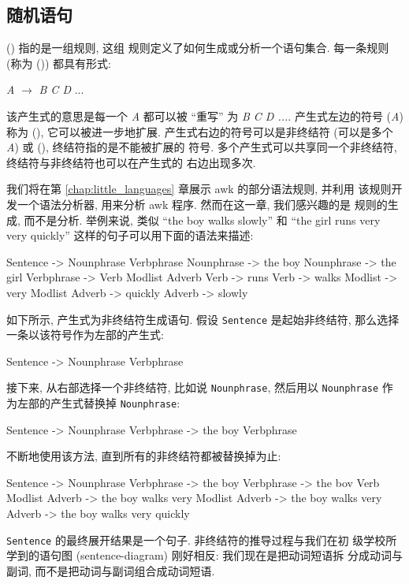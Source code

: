 \subsection{随机语句}
\label{subsec:random_sentences}

 () 指的是一组规则, 这组
规则定义了如何生成或分析一个语句集合. 每一条规则 (称为 
()) 都具有形式:
\begin{pattern}
    \indent\indent\textit{A} $\longrightarrow$ \textit{B C D} ...
\end{pattern}
该产生式的意思是每一个 \textit{A} 都可以被 ``重写'' 为 \textit{B C D ...}.
产生式左边的符号 (\textit{A}) 称为  (),
它可以被进一步地扩展. 产生式右边的符号可以是非终结符 (可以是多个
\textit{A}) 或  (), 终结符指的是不能被扩展的
符号. 多个产生式可以共享同一个非终结符, 终结符与非终结符也可以在产生式的
右边出现多次.

我们将在第 \ref{chap:little_languages} 章展示 awk 的部分语法规则, 并利用
该规则开发一个语法分析器, 用来分析 awk 程序. 然而在这一章, 我们感兴趣的是
规则的生成, 而不是分析. 举例来说, 类似 ``the boy walks slowly'' 和 ``the
girl runs very very quickly'' 这样的句子可以用下面的语法来描述:
\begin{file}
    Sentence -> Nounphrase Verbphrase
    Nounphrase -> the boy
    Nounphrase -> the girl
    Verbphrase -> Verb Modlist Adverb
    Verb -> runs
    Verb -> walks
    Modlist -> very Modlist
    Adverb -> quickly
    Adverb -> slowly
\end{file}

如下所示, 产生式为非终结符生成语句. 假设 \texttt{Sentence} 是起始非终结符,
那么选择一条以该符号作为左部的产生式:
\begin{file}
    Sentence -> Nounphrase Verbphrase
\end{file}
接下来, 从右部选择一个非终结符, 比如说 \texttt{Nounphrase}, 然后用以
\texttt{Nounphrase} 作为左部的产生式替换掉 \texttt{Nounphrase}:
\begin{file}
    Sentence -> Nounphrase Verbphrase
             -> the boy Verbphrase
\end{file}
不断地使用该方法, 直到所有的非终结符都被替换掉为止:
\begin{file}
    Sentence -> Nounphrase Verbphrase
             -> the boy Verbphrase
             -> the bov Verb Modlist Adverb
             -> the boy walks very Modlist Adverb
             -> the boy walks very Adverb
             -> the boy walks very quickly
\end{file}
\texttt{Sentence} 的最终展开结果是一个句子. 非终结符的推导过程与我们在初
级学校所学到的语句图 (sentence-diagram) 刚好相反: 我们现在是把动词短语拆
分成动词与副词, 而不是把动词与副词组合成动词短语.

